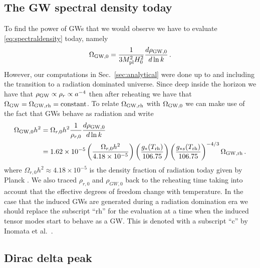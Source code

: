 \documentclass[a4paper,11pt]{article}
\numberwithin{equation}{section}
\begin{document}
\subsection{The GW spectral density today \label{sec:densitytoday}}
To find the power of GWs that we would observe we have to evaluate \eqref{eq:spectraldensity} today, namely
\begin{equation}\label{eq:spectraldensitytoday}
\Omega_{\rm GW,0}=\frac{1}{3 M_{\rm pl}^2 H_0^2}\frac{d \rho_{\rm GW,0}}{d\ln k}\,.
\end{equation}
However, our computations in Sec.~\ref{sec:analytical} were done up to and including the transition to a radiation dominated universe. Since deep inside the horizon we have that $\rho_{\rm GW}\propto \rho_r\propto a^{-4}$ then after reheating we have that $\Omega_{\rm GW}=\Omega_{\rm GW,\rm rh}={\rm constant}$. To relate $\Omega_{\rm GW,\rm rh}$ with $\Omega_{\rm GW,0}$ we can make use of the fact that GWs behave as radiation and write
\begin{align}\label{eq:spectraldensitytoday2}
\Omega_{\rm GW,0}h^2&=\Omega_{r,0}h^2\frac{1}{\rho_{r,0}}\frac{d \rho_{\rm GW,0}}{d\ln k}\nonumber\\&=1.62\times 10^{-5}\left(\frac{\Omega_{r,0}h^2}{4.18\times 10^{-5}}\right)\left(\frac{g_*(T_{\rm rh})}{106.75}\right)\left(\frac{g_{*s}(T_{\rm rh})}{106.75}\right)^{-4/3}\Omega_{\rm GW,rh}\,.
\end{align}
where $\Omega_{r,0}h^2\approx4.18\times 10^{-5}$ is the density fraction of radiation today given by Planck \cite{Aghanim:2018eyx}. We also traced $\rho_{r,0}$ and $\rho_{GW,0}$ back to the reheating time taking into account that the effective degrees of freedom change with temperature. In the case that the induced GWs are generated during a radiation domination era we should replace the subscript ``rh'' for the evaluation at a time when the induced tensor modes start to behave as a GW. This is denoted with a subscript ``c'' by Inomata et al.~\cite{Inomata:2016rbd}.


\subsection{Dirac delta peak \label{sec:sharp}}
\end{document}

